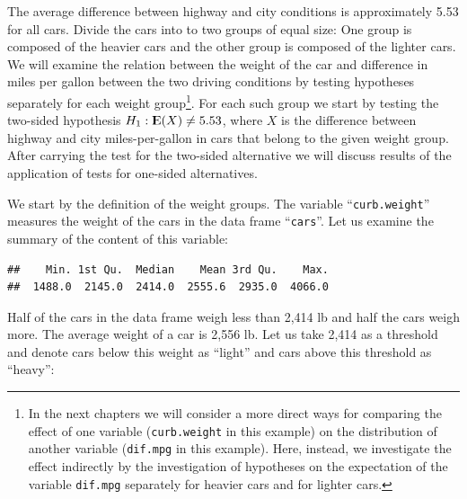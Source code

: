 \documentclass[]{krantz}
\makeatletter
\newenvironment{Shaded}{\begin{snugshade}}{\end{snugshade}}
\newcommand{\KeywordTok}[1]{\textcolor[rgb]{0.13,0.29,0.53}{\textbf{#1}}}
\newcommand{\DecValTok}[1]{\textcolor[rgb]{0.00,0.00,0.81}{#1}}
\newcommand{\StringTok}[1]{\textcolor[rgb]{0.31,0.60,0.02}{#1}}
\newcommand{\OperatorTok}[1]{\textcolor[rgb]{0.81,0.36,0.00}{\textbf{#1}}}
\newcommand{\NormalTok}[1]{#1}
\newcommand{\Expec}{{\rm I\kern-.3em E}}
\newenvironment{kframe}{%
\medskip{}
\setlength{\fboxsep}{.8em}
 \def\at@end@of@kframe{}%
 \ifinner\ifhmode%
  \def\at@end@of@kframe{\end{minipage}}%
  \begin{minipage}{\columnwidth}%
 \fi\fi%
 \def\FrameCommand##1{\hskip\@totalleftmargin \hskip-\fboxsep
 \colorbox{shadecolor}{##1}\hskip-\fboxsep
     \hskip-\linewidth \hskip-\@totalleftmargin \hskip\columnwidth}%
 \MakeFramed {\advance\hsize-\width
   \@totalleftmargin\z@ \linewidth\hsize
   \@setminipage}}%
 {\par\unskip\endMakeFramed%
 \at@end@of@kframe}
\renewenvironment{Shaded}{\begin{kframe}}{\end{kframe}}
\theoremstyle{definition}
\theoremstyle{definition}
\theoremstyle{definition}
\theoremstyle{remark}
\makeatother
\begin{document}
The average difference between highway and city conditions is
approximately 5.53 for all cars. Divide the cars into to two groups of
equal size: One group is composed of the heavier cars and the other
group is composed of the lighter cars. We will examine the relation
between the weight of the car and difference in miles per gallon between
the two driving conditions by testing hypotheses separately for each
weight group\footnote{In the next chapters we will consider a more
  direct ways for comparing the effect of one variable
  (\texttt{curb.weight} in this example) on the distribution of another
  variable (\texttt{dif.mpg} in this example). Here, instead, we
  investigate the effect indirectly by the investigation of hypotheses
  on the expectation of the variable \texttt{dif.mpg} separately for
  heavier cars and for lighter cars.}. For each such group we start by
testing the two-sided hypothesis \(H_1:\Expec(X) \not = 5.53\), where
\(X\) is the difference between highway and city miles-per-gallon in
cars that belong to the given weight group. After carrying the test for
the two-sided alternative we will discuss results of the application of
tests for one-sided alternatives.

We start by the definition of the weight groups. The variable
``\texttt{curb.weight}'' measures the weight of the cars in the data
frame ``\texttt{cars}''. Let us examine the summary of the content of
this variable:

\begin{Shaded}
\end{Shaded}

\begin{verbatim}
##    Min. 1st Qu.  Median    Mean 3rd Qu.    Max. 
##  1488.0  2145.0  2414.0  2555.6  2935.0  4066.0
\end{verbatim}

Half of the cars in the data frame weigh less than 2,414 lb and half the
cars weigh more. The average weight of a car is 2,556 lb. Let us take
2,414 as a threshold and denote cars below this weight as ``light'' and
cars above this threshold as ``heavy'':

\begin{Shaded}
\end{Shaded}
\end{document}
